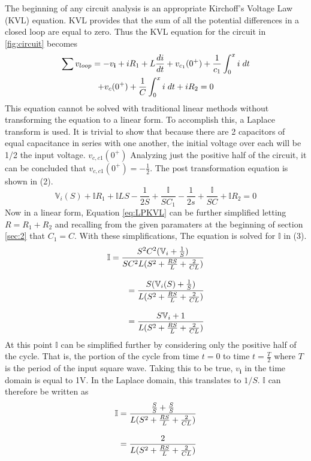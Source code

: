 \documentclass[conference]{IEEEtran}
\begin{document}
The beginning of any circuit analysis is an appropriate Kirchoff's Voltage Law (KVL) equation. KVL provides
that the sum of all the potential differences in a closed loop are equal to zero. Thus the KVL equation for the circuit in \ref{fig:circuit} becomes
\begin{multline} \label{eq:KVL}
\sum{v_{loop}} = -v_{\textbf{i}} + iR_1 + L\frac{di}{dt} + v_{c_1}(0^+) + \frac{1}{c_1}\int_0^xi\hspace{1mm}dt\\ + {v_c}(0^+) + \frac{1}{C}\int_0^xi\hspace{1mm}dt+iR_2 = 0
\end{multline}
This equation cannot be solved with traditional linear methods without transforming the equation to a linear form. To accomplish this, a Laplace transform is used. It is trivial to show that because there are 2 capacitors of equal capacitance in series with one another, the initial voltage over each will be 1/2 the input voltage. $v_{c,c1}(0^+)$ Analyzing just the positive half of the circuit, it can be concluded that $v_{c,c1}(0^+) = -\frac{1}{2}$. The post transformation equation is shown in (2).
\begin{equation} \label{eq:LPKVL}
    \mathbb{V}_i(S) + \mathbb{I}R_1 + \mathbb{I}LS - \frac{1}{2S} +\frac{\mathbb{I}}{SC_1} - \frac{1}{2s} + \frac{\mathbb{I} }{SC} + \mathbb{I}R_2 = 0
\end{equation}
Now in a linear form, Equation \ref{eq:LPKVL} can be further simplified letting $R = R_1 + R_2$ and recalling from the given paramaters at the beginning of section \ref{sec:2} that $C_1 = C$. With these simplifications, The equation is solved for $\mathbb{I}$ in (3).
\begin{equation} \label{eq:IPartial}
\jot 4mm
\begin{split}
\mathbb{I} = \frac{S^2C^2({\mathbb{V}}_i + \frac{1}{S})}{SC^2L(S^2+\frac{RS}{L} + \frac{2}{CL})}\\ 
= \frac{S({\mathbb{V}}_i(S) + \frac{1}{S})}{L(S^2 + \frac{RS}{L} + \frac{2}{CL})}\\
= \frac{S{\mathbb{V}}_i + 1}{L(S^2 + \frac{RS}{L} + \frac{2}{CL})}
\end{split}
\end{equation}
At this point $\mathbb{I}$ can be simplified further by considering only the positive half of the cycle. That is, the portion of the cycle from time $t = 0$ to time $t = \frac{T}{2}$ where $T$ is the period of the input square wave. Taking this to be true, $v_{\textbf{i}}$ in the time domain is equal to 1V. In the Laplace domain, this translates to $1/S$. $\mathbb{I}$ can therefore be written as
\begin{equation} \label{eq:I}
\jot 4mm
    \begin{split}
    \mathbb{I} = \frac{\frac{S}{S} + \frac{S}{S}}{L(S^2 + \frac{RS}{L} + \frac{2}{CL})}\\
    = \frac{2}{L(S^2 + \frac{RS}{L} + \frac{2}{CL})}
    \end{split}
\end{equation}
\end{document}
